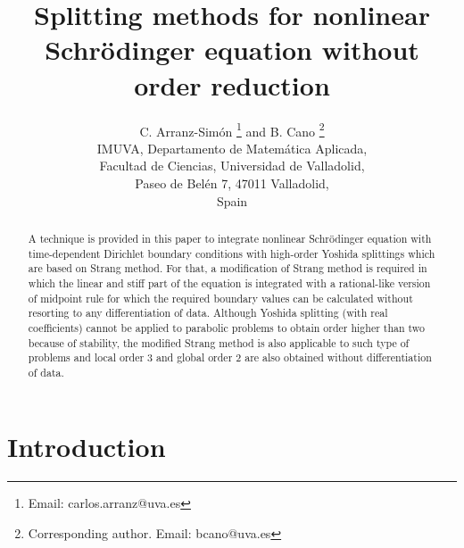 \documentclass[a4paper,12pt]{article}
\begin{document}
%
\title{Splitting methods for nonlinear Schr\"odinger equation without order reduction}
\author{{\sc C. Arranz-Sim\'on \thanks{Email: carlos.arranz@uva.es} {\sc and} B. Cano \thanks{Corresponding author. Email: bcano@uva.es}}  \\ \small
IMUVA, Departamento de Matem\'atica Aplicada,\\ \small Facultad de Ciencias, Universidad de
Valladolid,\\ \small Paseo de Bel\'en 7, 47011 Valladolid,\\ \small Spain
}
\date{}

%
%


\maketitle



\begin{abstract}
A technique is provided in this paper to integrate nonlinear Schr\"odinger equation with time-dependent Dirichlet boundary conditions with high-order Yoshida splittings which are based on Strang method. For that, a modification of Strang method is required in which the linear and stiff part of the equation is integrated with a rational-like version of midpoint rule for which the required boundary values can be calculated without resorting to any differentiation of data. Although Yoshida splitting (with real coefficients) cannot be applied to parabolic problems to obtain order higher than two because of stability, the modified Strang method is also applicable to such type of problems and local order $3$ and global order $2$ are also obtained without differentiation of data.
\end{abstract}




\section{Introduction}
\end{document}

